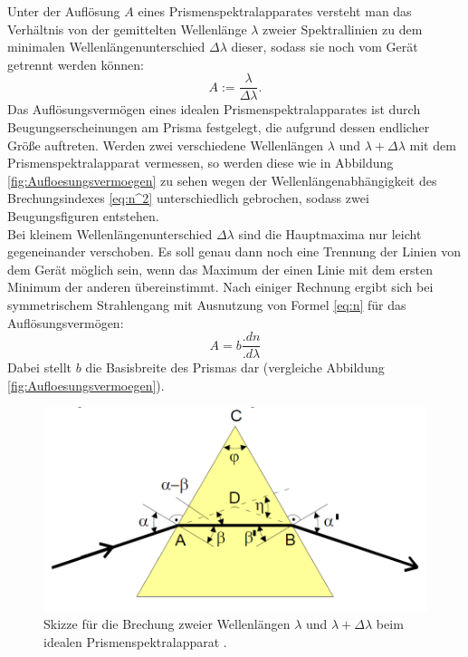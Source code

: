 Unter der Auflösung $A$ eines Prismenspektralapparates versteht man das Verhältnis von der gemittelten Wellenlänge $\lambda$ zweier Spektrallinien zu dem minimalen Wellenlängenunterschied $\Delta\lambda$ dieser, sodass sie noch vom Gerät getrennt werden können:
\[
A := \frac{\lambda}{\Delta\lambda}\text{.}
\]
Das Auflösungsvermögen eines idealen Prismenspektralapparates ist durch Beugungserscheinungen am Prisma festgelegt, die aufgrund dessen endlicher Größe auftreten. Werden zwei verschiedene Wellenlängen $\lambda$ und $\lambda +\Delta\lambda$ mit dem Prismenspektralapparat vermessen, so werden diese wie in Abbildung \ref{fig:Aufloesungsvermoegen} zu sehen wegen der Wellenlängenabhängigkeit des Brechungsindexes \eqref{eq:n^2} unterschiedlich gebrochen, sodass zwei Beugungsfiguren entstehen.\\
Bei kleinem Wellenlängenunterschied $\Delta\lambda$ sind die Hauptmaxima nur leicht gegeneinander verschoben. Es soll genau dann noch eine Trennung der Linien von dem Gerät möglich sein, wenn das Maximum der einen Linie mit dem ersten Minimum der anderen übereinstimmt. Nach einiger Rechnung ergibt sich bei symmetrischem Strahlengang mit Ausnutzung von Formel \eqref{eq:n} für das Auflösungsvermögen:
\begin{equation}
A = b\frac{.dn}{.d\lambda}
\end{equation}   
Dabei stellt $b$ die Basisbreite des Prismas dar (vergleiche Abbildung \ref{fig:Aufloesungsvermoegen}). 

\begin{figure}
\centering
\includegraphics[width=\linewidth-50pt,height=\textheight-50pt,keepaspectratio]{content/images/Prisma.png}
\caption{Skizze für die Brechung zweier Wellenlängen $\lambda$ und $\lambda +\Delta\lambda$ beim idealen Prismenspektralapparat \cite{V402}.}
\label{fig:Prisma}
\end{figure}



